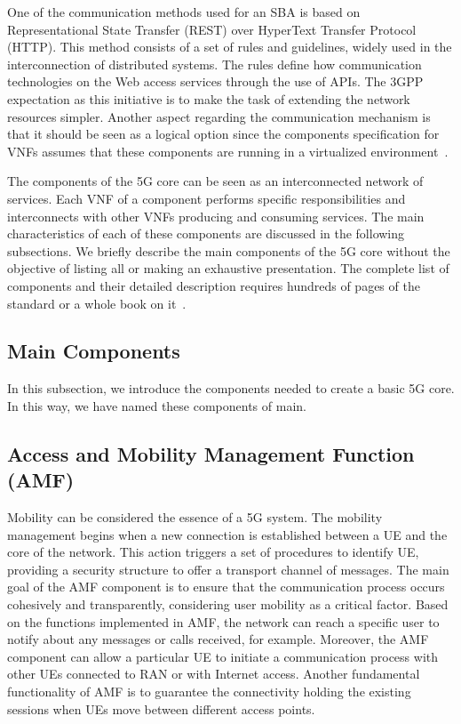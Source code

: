 One of the communication methods used for an SBA is based on Representational State Transfer (REST) over HyperText Transfer Protocol (HTTP). This method consists of a set of rules and guidelines, widely used in the interconnection of distributed systems. The rules define how communication technologies on the Web access services through the use of APIs. The 3GPP expectation as this initiative is to make the task of extending the network resources simpler. Another aspect regarding the communication mechanism is that it should be seen as a logical option since the components specification for VNFs assumes that these components are running in a virtualized environment~\cite{imadali2018NFV}. 

The components of the 5G core can be seen as an interconnected network of services. Each VNF of a component performs specific responsibilities and interconnects with other VNFs producing and consuming services. The main characteristics of each of these components are discussed in the following subsections. We briefly describe the main components of the 5G core without the objective of listing all or making an exhaustive presentation. The complete list of components and their detailed description requires hundreds of pages of the standard or a whole book on it~\cite{hedman20195g}.


\subsection{Main Components}

In this subsection, we introduce the components needed to create a basic 5G core. In this way, we have named these components of main.

\subsection*{Access and Mobility Management Function (AMF)}

Mobility can be considered the essence of a 5G system. The mobility management begins when a new connection is established between a UE and the core of the network. This action triggers a set of procedures to identify UE, providing a security structure to offer a transport channel of messages. The main goal of the AMF component is to ensure that the communication process occurs cohesively and transparently, considering user mobility as a critical factor. Based on the functions implemented in AMF, the network can reach a specific user to notify about any messages or calls received, for example. Moreover, the AMF component can allow a particular UE to initiate a communication process with other UEs connected to RAN or with Internet access. Another fundamental functionality of AMF is to guarantee the connectivity holding the existing sessions when UEs move between different access points.

